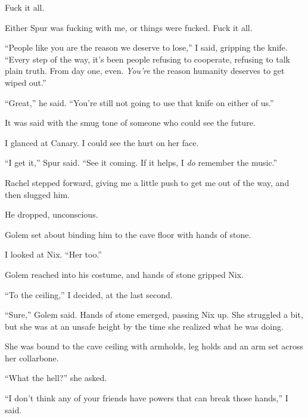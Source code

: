 Fuck it all.



Either Spur was fucking with me, or things were fucked.  Fuck it all.



``People like you are the reason we deserve to lose,'' I said, gripping the knife.  ``Every step of the way, it's been people refusing to cooperate, refusing to talk plain truth.  From day one, even.  \emph{You're} the reason humanity deserves to get wiped out.''



``Great,'' he said.  ``You're still not going to use that knife on either of us.''



It was said with the smug tone of someone who could see the future.



I glanced at Canary.  I could see the hurt on her face.



``I get it,'' Spur said.  ``See it coming.  If it helps, I \emph{do} remember the music.''



Rachel stepped forward, giving me a little push to get me out of the way, and then slugged him.



He dropped, unconscious.



Golem set about binding him to the cave floor with hands of stone.



I looked at Nix.  ``Her too.''



Golem reached into his costume, and hands of stone gripped Nix.



``To the ceiling,'' I decided, at the last second.



``Sure,'' Golem said.  Hands of stone emerged, passing Nix up.  She struggled a bit, but she was at an unsafe height by the time she realized what he was doing.



She was bound to the cave ceiling with armholds, leg holds and an arm set across her collarbone.



``What the hell?'' she asked.



``I don't think any of your friends have powers that can break those hands,'' I said.



